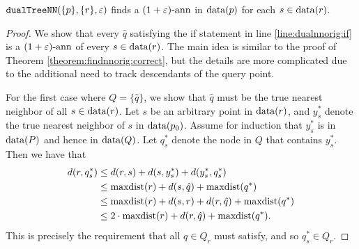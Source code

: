 \documentclass[../main.tex]{subfiles}
\newcommand{\dist}[2]{\distf({#1},{#2})}
\newcommand{\distf}{d}
\newcommand{\mkfunction}[1]{\ifmmode{\textnormal{{#1}}}}
\newcommand{\maxdist}[1]    {\mkfunction{maxdist}({#1})}
\newcommand{\data}[1]       {\mkfunction{data}({#1})}
\newcommand{\dualnn}{\ensuremath{\textnormal{\ttfamily dualTreeNN}}}
\begin{document}
\begin{theorem}
    $\dualnn(\{p\},\{r\},\varepsilon)$ finds a $(1+\varepsilon)\text{-ann}$ in $\data{p}$ for each $s\in\data{r}$.
\end{theorem}
\begin{proof}
    We show that every $\hat q$ satisfying the if statement in line \ref{line:dualnnorig:if} is a $(1+\varepsilon)\text{-ann}$ of every $s\in\data{r}$.
    The main idea is similar to the proof of Theorem \ref{theorem:findnnorig:correct},
    but the details are more complicated due to the additional need to track descendants of the query point.

    For the first case where $Q=\{\hat q\}$, 
    we show that $\hat q$ must be the true nearest neighbor of all $s\in\data{r}$.
    Let $s$ be an arbitrary point in $\data r$,
    and $y^*_s$ denote the true nearest neighbor of $s$ in $\data{p_0}$.
    Assume for induction that $y^*_s$ is in $\data{P}$ and hence in $\data{Q}$.
    Let $q^*_s$ denote the node in $Q$ that contains $y^*_s$.
    Then we have that
    \begin{align}
        \dist{r}{q^*_s}
        &\le \dist{r}{s} + \dist{s}{y^*_s} + \dist{y^*_s}{q^*_s}
        \\&\le \maxdist{r} + \dist{s}{\hat q} + \maxdist{q^*}
        \\&\le \maxdist{r} + \dist{s}{r} + \dist{r}{\hat q} + \maxdist{q^*}
        \\&\le 2\cdot\maxdist{r} + \dist{r}{\hat q} + \maxdist{q^*}
        .
    \end{align}
    This is precisely the requirement that all $q\in Q_r$ must satisfy,
    and so $q^*_s \in Q_r$.


\end{proof}
\end{document}
